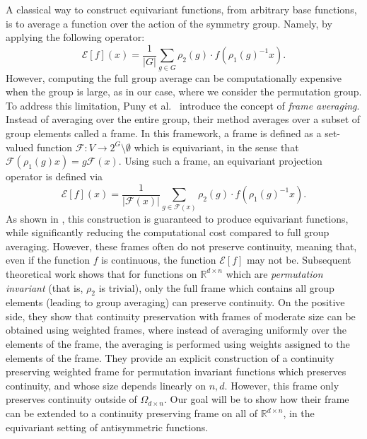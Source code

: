 \documentclass{amsart}
\theoremstyle{plain}
\theoremstyle{definition}
\theoremstyle{remark}
\newcommand{\RR}{\mathbb{R}}
\newcommand{\abs}[1]{\left\lvert#1\right\rvert}
\begin{document}
 A classical way to construct equivariant functions, from arbitrary base functions, is to average a function over the action of the symmetry group. Namely, by applying the following operator:
\begin{equation}
    \mathcal{E}[f](x) =
\frac{1}{\abs{G}}
\sum_{g \in G}
\rho_2(g) \cdot f(\rho_1(g)^{-1} x).
\end{equation}
However, computing the full group average can be computationally expensive when the group is large,  as in our case, where we consider the permutation group. To address this limitation, Puny et al.~\cite{puny2022frameaveraginginvariantequivariant} introduce the concept of \emph{frame averaging}. Instead of averaging over the entire group, their method averages over a subset of group elements called a frame. In this framework, a frame is defined as a set-valued function $\mathcal{F} : V \rightarrow 2^{G} \setminus \emptyset$ which is equivariant, in the sense that $\mathcal{F}(\rho_1(g)x)=g\mathcal{F}(x) $.  Using such a frame, an equivariant projection operator is defined via
\begin{equation}
\mathcal{E}[f](x)
=
\frac{1}{\abs{\mathcal{F}(x)}}
\sum_{g \in \mathcal{F}(x)}
{\rho_2(g)\cdot f(\rho_1(g)^{-1}x)}. 
\end{equation}
As shown in \cite{puny2022frameaveraginginvariantequivariant}, this construction is guaranteed to produce equivariant functions, while significantly reducing the computational cost compared to full group averaging. However, these frames often do not preserve continuity, meaning that, even if the function $f$ is continuous, the function $ \mathcal{E}[f]$ may not be. 
Subsequent theoretical work \cite{frames}  shows that for functions on $\RR^{d\times n}$ which are \emph{permutation invariant} (that is, $\rho_2$ is trivial), only the full frame which contains all group elements (leading to group averaging) can preserve continuity. On the positive side, they show that continuity preservation with frames of moderate size can be obtained using weighted frames,  where instead of averaging uniformly over the elements of the frame, the averaging is performed using weights assigned to the elements of the frame. They provide an explicit construction of a continuity preserving weighted frame for permutation invariant functions which preserves continuity, and whose size depends linearly on $n,d$. However, this frame only preserves continuity outside of $\Omega_{d\times n}$. Our goal will be to show how their frame can be extended to a continuity preserving frame on all of $\RR^{d\times n}$, in the equivariant setting of antisymmetric functions. 
\end{document}
